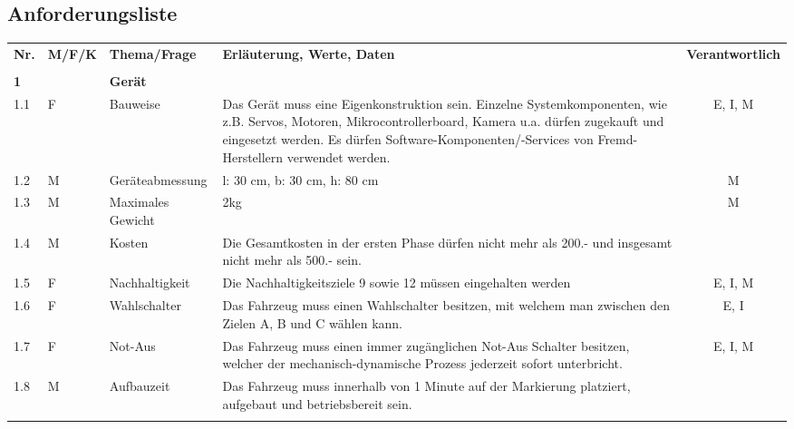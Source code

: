 \documentclass{article}
\begin{document}
\begin{landscape} %
    \section{Anforderungsliste}
    \begin{longtable}{llp{4cm}p{15cm}c}
        \textbf{Nr.} & \textbf{M/F/K} & \textbf{Thema/Frage} & \textbf{Erläuterung, Werte, Daten} & \textbf{Verantwortlich} \\
        \\
        \textbf{1} &  & \textbf{Gerät} & &   \\
        1.1 & F & Bauweise & Das Gerät muss eine Eigenkonstruktion sein. Einzelne Systemkomponenten, wie z.B. Servos,
        Motoren, Mikrocontrollerboard, Kamera u.a. dürfen zugekauft und eingesetzt werden. Es
        dürfen Software-Komponenten/-Services von Fremd-Herstellern verwendet werden. & E, I, M  \\ 
        1.2 & M & Geräteabmessung & l: 30 cm, b: 30 cm, h: 80 cm & M \\
        1.3 & M & Maximales Gewicht & 2kg & M \\
        1.4 & M & Kosten & Die Gesamtkosten in der ersten Phase dürfen nicht mehr als 200.- und insgesamt nicht mehr als 500.- sein. & \\
        1.5 & F & Nachhaltigkeit & Die Nachhaltigkeitsziele 9 sowie 12 müssen eingehalten werden & E, I, M \\
        1.6 & F & Wahlschalter & Das Fahrzeug muss einen Wahlschalter besitzen, mit welchem man zwischen den Zielen A, B und C wählen kann. & E, I \\
        1.7 & F & Not-Aus & Das Fahrzeug muss einen immer zugänglichen Not-Aus Schalter besitzen, welcher der mechanisch-dynamische Prozess
        jederzeit sofort unterbricht. & E, I, M \\
        1.8 & M & Aufbauzeit & Das Fahrzeug muss innerhalb von 1 Minute auf der Markierung platziert, aufgebaut und betriebsbereit sein. & \\
		\\


\end{longtable}
\end{landscape}
\end{document}
